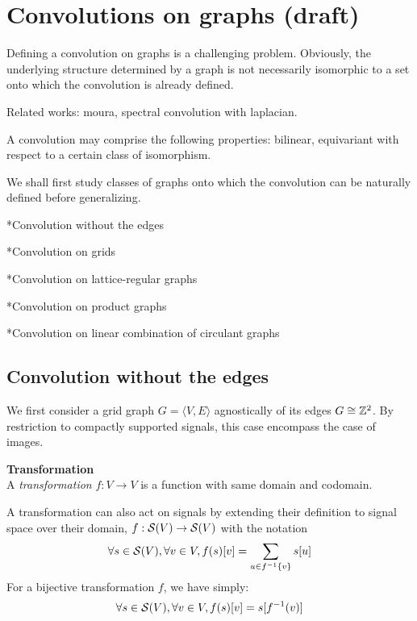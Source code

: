 \section{Convolutions on graphs (draft)}

Defining a convolution on graphs is a challenging problem. Obviously, the underlying structure determined by a graph is not necessarily isomorphic to a set onto which the convolution is already defined. 

Related works: moura, spectral convolution with laplacian.

A convolution may comprise the following properties: bilinear, equivariant with respect to a certain class of isomorphism.

We shall first study classes of graphs onto which the convolution can be naturally defined before generalizing.

*Convolution without the edges

*Convolution on grids

*Convolution on lattice-regular graphs

*Convolution on product graphs

*Convolution on linear combination of circulant graphs

\subsection{Convolution without the edges}

We first consider a grid graph $G = \langle V,E \rangle$ agnostically of its edges \ie $G \cong \mathbb{Z}^2$. By restriction to compactly supported signals, this case encompass the case of images.

\begin{definition}\textbf{Transformation}\\
A \emph{transformation} $f: V \rightarrow V$ is a function with same domain and codomain.

A transformation can also act on signals by extending their definition to signal space over their domain, $f: \mathcal{S}(V) \rightarrow \mathcal{S}(V)$ with the notation
\begin{gather*}
\forall s \in \mathcal{S}(V), \forall v \in V, f(s)[v] = \sum_{u \in f^{-1}\{v\}}{s[u]}
\end{gather*}
For a bijective transformation $f$, we have simply:
\begin{gather*}
\forall s \in \mathcal{S}(V), \forall v \in V, f(s)[v] = s[f^{-1}(v)]
\end{gather*}
\end{definition}

